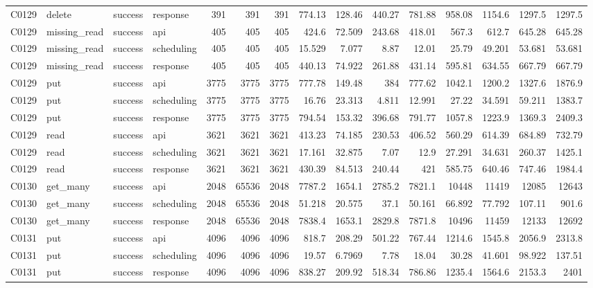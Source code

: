 \begin{landscape}
\begin{longtable}{llllrrrrrrrrrrr}
C0129 & delete & success & response & 391 & 391 & 391 & 774.13 & 128.46 & 440.27 & 781.88 & 958.08 & 1154.6 & 1297.5 & 1297.5\\
C0129 & missing\_\allowbreak{}read & success & api & 405 & 405 & 405 & 424.6 & 72.509 & 243.68 & 418.01 & 567.3 & 612.7 & 645.28 & 645.28\\
C0129 & missing\_\allowbreak{}read & success & scheduling & 405 & 405 & 405 & 15.529 & 7.077 & 8.87 & 12.01 & 25.79 & 49.201 & 53.681 & 53.681\\
C0129 & missing\_\allowbreak{}read & success & response & 405 & 405 & 405 & 440.13 & 74.922 & 261.88 & 431.14 & 595.81 & 634.55 & 667.79 & 667.79\\
C0129 & put & success & api & 3775 & 3775 & 3775 & 777.78 & 149.48 & 384 & 777.62 & 1042.1 & 1200.2 & 1327.6 & 1876.9\\
C0129 & put & success & scheduling & 3775 & 3775 & 3775 & 16.76 & 23.313 & 4.811 & 12.991 & 27.22 & 34.591 & 59.211 & 1383.7\\
C0129 & put & success & response & 3775 & 3775 & 3775 & 794.54 & 153.32 & 396.68 & 791.77 & 1057.8 & 1223.9 & 1369.3 & 2409.3\\
C0129 & read & success & api & 3621 & 3621 & 3621 & 413.23 & 74.185 & 230.53 & 406.52 & 560.29 & 614.39 & 684.89 & 732.79\\
C0129 & read & success & scheduling & 3621 & 3621 & 3621 & 17.161 & 32.875 & 7.07 & 12.9 & 27.291 & 34.631 & 260.37 & 1425.1\\
C0129 & read & success & response & 3621 & 3621 & 3621 & 430.39 & 84.513 & 240.44 & 421 & 585.75 & 640.46 & 747.46 & 1984.4\\
C0130 & get\_\allowbreak{}many & success & api & 2048 & 65536 & 2048 & 7787.2 & 1654.1 & 2785.2 & 7821.1 & 10448 & 11419 & 12085 & 12643\\
C0130 & get\_\allowbreak{}many & success & scheduling & 2048 & 65536 & 2048 & 51.218 & 20.575 & 37.1 & 50.161 & 66.892 & 77.792 & 107.11 & 901.6\\
C0130 & get\_\allowbreak{}many & success & response & 2048 & 65536 & 2048 & 7838.4 & 1653.1 & 2829.8 & 7871.8 & 10496 & 11459 & 12133 & 12692\\
C0131 & put & success & api & 4096 & 4096 & 4096 & 818.7 & 208.29 & 501.22 & 767.44 & 1214.6 & 1545.8 & 2056.9 & 2313.8\\
C0131 & put & success & scheduling & 4096 & 4096 & 4096 & 19.57 & 6.7969 & 7.78 & 18.04 & 30.28 & 41.601 & 98.922 & 137.51\\
C0131 & put & success & response & 4096 & 4096 & 4096 & 838.27 & 209.92 & 518.34 & 786.86 & 1235.4 & 1564.6 & 2153.3 & 2401\\

\end{longtable}
\end{landscape}
